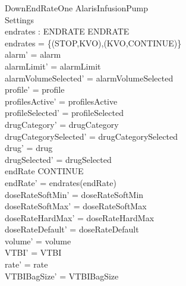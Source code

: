 \begin{schema}{DownEndRateOne}
	\Delta AlarisInfusionPump\\
	\pagebreak
	 Settings\\
	endrates : ENDRATE \rel ENDRATE\\
	\where
	endrates = \{(STOP,KVO),(KVO,CONTINUE)\}\\
	alarm' = alarm\\
	alarmLimit' = alarmLimit\\
	alarmVolumeSelected' = alarmVolumeSelected\\
	profile' = profile\\
	profilesActive' = profilesActive\\
	profileSelected' = profileSelected\\
	drugCategory' = drugCategory\\ 
	drugCategorySelected' = drugCategorySelected\\
	drug' = drug\\ 
	drugSelected' = drugSelected\\
	endRate \neq CONTINUE\\
	endRate' = endrates(endRate)\\
	doseRateSoftMin' = doseRateSoftMin\\
	doseRateSoftMax' = doseRateSoftMax\\
	doseRateHardMax' = doseRateHardMax\\
	doseRateDefault' = doseRateDefault\\
	volume' = volume\\
	VTBI' = VTBI\\
	rate' = rate\\
	VTBIBagSize' = VTBIBagSize\\ 

\end{schema}
